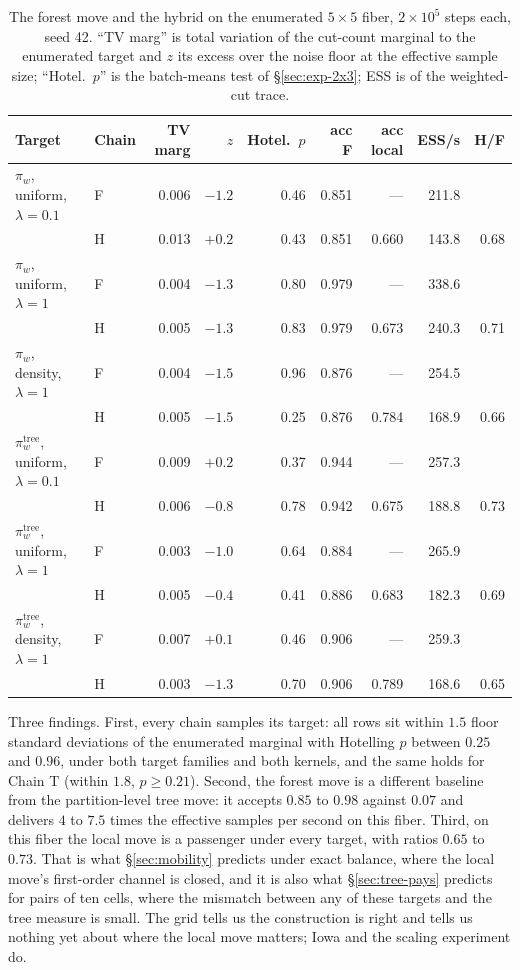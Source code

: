 \documentclass[11pt]{article}
\begin{document}
\begin{table}[htbp]
\centering
\small
\begin{tabular}{llrrrrrrr}
\toprule
Target & Chain & TV marg & $z$ & Hotel.\ $p$ & acc F & acc local & ESS/s & H/F \\
\midrule
$\pi_w$, uniform, $\lambda{=}0.1$ & F & 0.006 & $-1.2$ & 0.46 & 0.851 & --- & 211.8 & \\
 & H & 0.013 & $+0.2$ & 0.43 & 0.851 & 0.660 & 143.8 & 0.68 \\
$\pi_w$, uniform, $\lambda{=}1$ & F & 0.004 & $-1.3$ & 0.80 & 0.979 & --- & 338.6 & \\
 & H & 0.005 & $-1.3$ & 0.83 & 0.979 & 0.673 & 240.3 & 0.71 \\
$\pi_w$, density, $\lambda{=}1$ & F & 0.004 & $-1.5$ & 0.96 & 0.876 & --- & 254.5 & \\
 & H & 0.005 & $-1.5$ & 0.25 & 0.876 & 0.784 & 168.9 & 0.66 \\
$\pi_w^{\mathrm{tree}}$, uniform, $\lambda{=}0.1$ & F & 0.009 & $+0.2$ & 0.37 & 0.944 & --- & 257.3 & \\
 & H & 0.006 & $-0.8$ & 0.78 & 0.942 & 0.675 & 188.8 & 0.73 \\
$\pi_w^{\mathrm{tree}}$, uniform, $\lambda{=}1$ & F & 0.003 & $-1.0$ & 0.64 & 0.884 & --- & 265.9 & \\
 & H & 0.005 & $-0.4$ & 0.41 & 0.886 & 0.683 & 182.3 & 0.69 \\
$\pi_w^{\mathrm{tree}}$, density, $\lambda{=}1$ & F & 0.007 & $+0.1$ & 0.46 & 0.906 & --- & 259.3 & \\
 & H & 0.003 & $-1.3$ & 0.70 & 0.906 & 0.789 & 168.6 & 0.65 \\
\bottomrule
\end{tabular}
\caption{The forest move and the hybrid on the enumerated $5 \times 5$
  fiber, $2 \times 10^5$ steps each, seed 42. ``TV marg'' is total
  variation of the cut-count marginal to the enumerated target and $z$
  its excess over the noise floor at the effective sample size;
  ``Hotel.\ $p$'' is the batch-means test of \S\ref{sec:exp-2x3}; ESS
  is of the weighted-cut trace.}\label{tab:hybrid-5x5}
\end{table}

Three findings. First, every chain samples its target: all rows sit
within $1.5$ floor standard deviations of the enumerated marginal with
Hotelling $p$ between $0.25$ and $0.96$, under both target families
and both kernels, and the same holds for Chain T (within $1.8$,
$p \ge 0.21$). Second, the forest move is a different baseline from
the partition-level tree move: it accepts $0.85$ to $0.98$ against
$0.07$ and delivers $4$ to $7.5$ times the effective samples per
second on this fiber. Third, on this fiber the local move is a
passenger under every target, with ratios $0.65$ to $0.73$. That is what
\S\ref{sec:mobility} predicts under exact balance, where the local
move's first-order channel is closed, and it is also what
\S\ref{sec:tree-pays} predicts for pairs of ten cells, where the
mismatch between any of these targets and the tree measure is small.
The grid tells us the construction is right and tells us nothing yet
about where the local move matters; Iowa and the scaling experiment
do.
\end{document}
